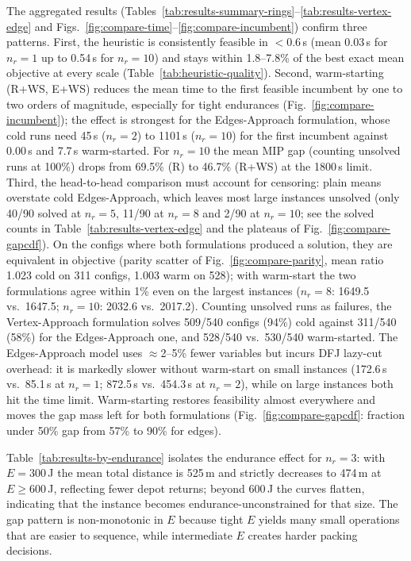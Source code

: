 \documentclass[12pt]{elsarticle}
\begin{document}
The aggregated results (Tables~\ref{tab:results-summary-rings}--\ref{tab:results-vertex-edge} and Figs.~\ref{fig:compare-time}--\ref{fig:compare-incumbent}) confirm three patterns. First, the heuristic is consistently feasible in $<0.6$\,s (mean 0.03\,s for $n_r=1$ up to 0.54\,s for $n_r=10$) and stays within 1.8--7.8\% of the best exact mean objective at every scale (Table~\ref{tab:heuristic-quality}). Second, warm-starting (R+WS, E+WS) reduces the mean time to the first feasible incumbent by one to two orders of magnitude, especially for tight endurances (Fig.~\ref{fig:compare-incumbent}); the effect is strongest for the Edges-Approach formulation, whose cold runs need 45\,s ($n_r=2$) to 1101\,s ($n_r=10$) for the first incumbent against 0.00\,s and 7.7\,s warm-started. For $n_r=10$ the mean MIP gap (counting unsolved runs at 100\%) drops from 69.5\% (R) to 46.7\% (R+WS) at the 1800\,s limit. Third, the head-to-head comparison must account for censoring: plain means overstate cold Edges-Approach, which leaves most large instances unsolved (only 40/90 solved at $n_r=5$, 11/90 at $n_r=8$ and 2/90 at $n_r=10$; see the solved counts in Table~\ref{tab:results-vertex-edge} and the plateaus of Fig.~\ref{fig:compare-gapcdf}). On the configs where both formulations produced a solution, they are equivalent in objective (parity scatter of Fig.~\ref{fig:compare-parity}, mean ratio 1.023 cold on 311 configs, 1.003 warm on 528); with warm-start the two formulations agree within 1\% even on the largest instances ($n_r=8$: 1649.5 vs.\ 1647.5; $n_r=10$: 2032.6 vs.\ 2017.2). Counting unsolved runs as failures, the Vertex-Approach formulation solves 509/540 configs (94\%) cold against 311/540 (58\%) for the Edges-Approach one, and 528/540 vs.\ 530/540 warm-started. The Edges-Approach model uses $\approx$2--5\% fewer variables but incurs DFJ lazy-cut overhead: it is markedly slower without warm-start on small instances (172.6\,s vs.\ 85.1\,s at $n_r=1$; 872.5\,s vs.\ 454.3\,s at $n_r=2$), while on large instances both hit the time limit. Warm-starting restores feasibility almost everywhere and moves the gap mass left for both formulations (Fig.~\ref{fig:compare-gapcdf}: fraction under 50\% gap from 57\% to 90\% for edges).

Table~\ref{tab:results-by-endurance} isolates the endurance effect for $n_r=3$: with $E=300$\,J the mean total distance is 525\,m and strictly decreases to 474\,m at $E\ge600$\,J, reflecting fewer depot returns; beyond 600\,J the curves flatten, indicating that the instance becomes endurance-unconstrained for that size. The gap pattern is non-monotonic in $E$ because tight $E$ yields many small operations that are easier to sequence, while intermediate $E$ creates harder packing decisions.
\end{document}
